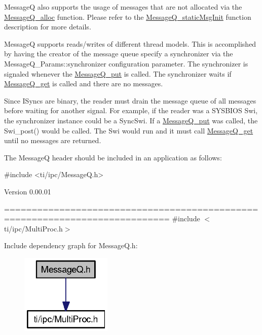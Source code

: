 MessageQ also supports the usage of messages that are not allocated via the \hyperlink{_message_q_8h_ad8de6381a05a4d8a672d06a3b5676a24}{MessageQ\_\-alloc} function. Please refer to the \hyperlink{_message_q_8h_a5b627fa66c267f53cccb0a960fe23a64}{MessageQ\_\-staticMsgInit} function description for more details.

MessageQ supports reads/writes of different thread models. This is accomplished by having the creator of the message queue specify a synchronizer via the MessageQ\_\-Params::synchronizer configuration parameter. The synchronizer is signaled whenever the \hyperlink{_message_q_8h_aa628f9bf897924f61d6adfba3f82fa8d}{MessageQ\_\-put} is called. The synchronizer waits if \hyperlink{_message_q_8h_aaeb270f6b50d96f1e1dd134591ffc380}{MessageQ\_\-get} is called and there are no messages.

Since ISyncs are binary, the reader must drain the message queue of all messages before waiting for another signal. For example, if the reader was a SYSBIOS Swi, the synchronizer instance could be a SyncSwi. If a \hyperlink{_message_q_8h_aa628f9bf897924f61d6adfba3f82fa8d}{MessageQ\_\-put} was called, the Swi\_\-post() would be called. The Swi would run and it must call \hyperlink{_message_q_8h_aaeb270f6b50d96f1e1dd134591ffc380}{MessageQ\_\-get} until no messages are returned.

The MessageQ header should be included in an application as follows: 
\begin{DoxyCode}
  #include <ti/ipc/MessageQ.h>
\end{DoxyCode}


\begin{DoxyVersion}{Version}
0.00.01
\end{DoxyVersion}
============================================================================ {\ttfamily \#include $<$ti/ipc/MultiProc.h$>$}\par
Include dependency graph for MessageQ.h:
\nopagebreak
\begin{figure}[H]
\begin{center}
\leavevmode
\includegraphics[width=123pt]{_message_q_8h__incl}
\end{center}
\end{figure}
